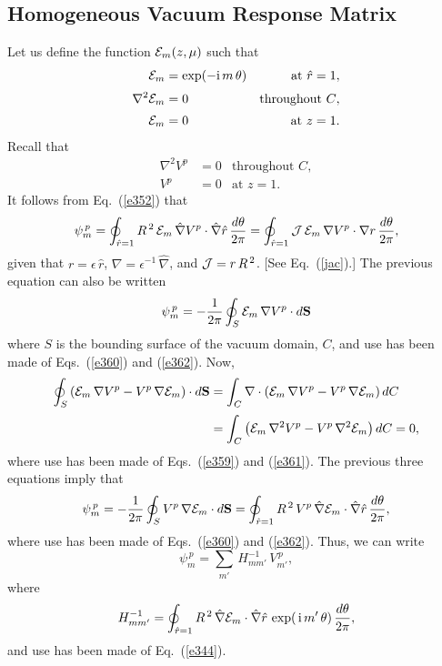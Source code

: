 \documentclass[12pt,prb,aps]{revtex4-1}
\begin{document}
\subsection{Homogeneous Vacuum Response Matrix}
Let us define the function ${\cal E}_m(z,\mu)$ such that
\begin{align}\label{e358}
{\cal E}_m&= \exp(-{\rm i}\,m\,\theta) &\mbox{at $\hat{r}=1$},\\[0.5ex]
\nabla^2{\cal E}_m &= 0 &\mbox{throughout $C$},\label{e359}\\[0.5ex]
{\cal E}_m &= 0& \mbox{at $z=1$}.\label{e360}
\end{align}
Recall that
\begin{align}
\nabla^2 V^p &= 0 &\mbox{throughout $C$},\label{e361}\\[0.5ex]
V^p &= 0& \mbox{at $z=1$}.\label{e362}
\end{align}
It follows from Eq.~(\ref{e352}) that
\begin{equation}
\psi_m^{\,p} = \oint_{\hat{r}=1}R^{\,2}\,{\cal E}_m\,\hat{\nabla} V^p\cdot \hat{\nabla}\hat{r}\,\frac{d\theta}{2\pi}=\oint_{\hat{r}=1}{\cal J}\,{\cal E}_m\,\nabla V^p\cdot \nabla r\,\frac{d\theta}{2\pi},
\end{equation}
given that $r=\epsilon\,\hat{r}$, $\nabla = \epsilon^{-1}\,\hat{\nabla}$, and ${\cal J}=r\,R^{\,2}$. [See Eq.~(\ref{jac}).]
The previous equation can also be written
\begin{equation}
\psi_m^{\,p} =-\frac{1}{2\pi} \oint_{S}{\cal E}_m\,\nabla V^p\cdot d{\bf S}
\end{equation}
where $S$ is the bounding surface of the vacuum domain, $C$, and use has been made of Eqs.~(\ref{e360}) and (\ref{e362}). 
Now,
\begin{align}
\oint_S\left({\cal E}_m\,\nabla V^p-V^p\,\nabla{\cal E}_m\right)\cdot d{\bf S}&=
\int_C\nabla\cdot\left({\cal E}_m\,\nabla V^p-V^p\,\nabla{\cal E}_m\right)dC\nonumber\\[0.5ex]
&
=\int_C\left({\cal E}_m\,\nabla^2 V^p - V^p\,\nabla^2{\cal E}_m\right)dC = 0,
\end{align}
where use has been made of Eqs.~(\ref{e359}) and (\ref{e361}). The previous three equations imply that 
\begin{equation}
\psi_m^{\,p} = -\frac{1}{2\pi} \oint_{S}V^p\,\nabla {\cal E}_m\cdot d{\bf S}=  \oint_{\hat{r}=1}R^{\,2}\,V^p\,\hat{\nabla} {\cal E}_m\cdot \hat{\nabla}\hat{r}\,\frac{d\theta}{2\pi},
\end{equation}
where  use has been made of Eqs.~(\ref{e360}) and (\ref{e362}).
Thus, we can
write
\begin{equation}
\psi_m^{\,p} = \sum_{m'}\,H_{mm'}^{-1}\,V_{m'}^{\,p},
\end{equation}
where 
\begin{equation}\label{e368}
H_{mm'}^{-1}=\oint_{\hat{r}=1}R^{\,2}\,\hat{\nabla} {\cal E}_m\cdot \hat{\nabla}\hat{r}\,\exp(\,{\rm i}\,m'\,\theta)\,\frac{d\theta}{2\pi},
\end{equation}
and use has been made of Eq.~(\ref{e344}). 
\end{document}
